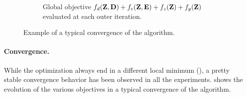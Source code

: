 \begin{figure}[ht]
\begin{subfigure}[b]{0.9\textwidth}
		\caption{Global objective $f_d(\mathbf{Z}, \mathbf{D}) + f_e(\mathbf{Z}, \mathbf{E}) + f_z(\mathbf{Z}) + f_g(\mathbf{Z})$ evaluated at each outer iteration.}
	\end{subfigure}
	\caption[]{Example of a typical convergence of the algorithm.}
	\label{fig:convergence}
\end{figure}

\paragraph{Convergence.}

While the optimization always end in a different local minimum (), a pretty stable convergence behavior has been observed in all the experiments.  shows the evolution of the various objectives in a typical convergence of the algorithm.






